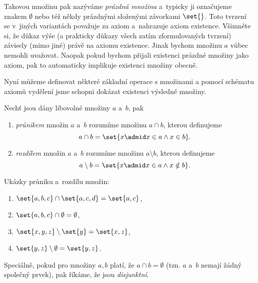 Takovou množinu pak nazýváme \emph{prázdná množina} a~typicky ji označujeme znakem $\emptyset$ nebo též někdy prázdnými složenými závorkami $\set{}$. Toto tvrzení se v~jiných variantách \ZF{} považuje za axiom a~nahrazuje axiom existence. Všimněte si, že důkaz výše (a prakticky důkazy všech zatím zformulovaných tvrzení) závisely (mimo jiné) právě na axiomu existence. Jinak bychom množinu $a$ vůbec nemohli uvažovat. Naopak pokud bychom přijali existenci prázdné množiny jako axiom, pak to automaticky implikuje existenci množiny obecně.\par
Nyní můžeme definovat některé základní operace s množinami a pomocí schématu axiomů vydělení jsme schopni dokázat existenci výsledné množiny.
\begin{definition}\label{def:prunik_rozdil}
    Nechť jsou dány libovolné množiny $a$ a~$b$, pak
    \begin{enumerate}[label=(\roman*)]
        \item \emph{průnikem} množin $a$ a~$b$ rozumíme množinu $a \cap b$, kterou definujeme
        \begin{equation*}
            a\cap b=\set{x \admid x\in a \land x\in b}.
        \end{equation*}
        \item \emph{rozdílem} množin $a$ a~$b$ rozumíme množinu $a \setminus b$, kterou definujeme
        \begin{equation*}
            a\setminus b=\set{x \admid x\in a \land x\notin b}.
        \end{equation*}
    \end{enumerate}
\end{definition}
\begin{example}
    Ukázky průniku a~rozdílu množin:
    \begin{enumerate}[label=(\roman*)]
        \item $\set{a,b,c}\cap\set{a,c,d}=\set{a,c}$,
        \item $\set{a,b,c}\cap\emptyset=\emptyset$,
        \item $\set{x,y,z}\setminus\set{y}=\set{x,z}$,
        \item $\set{y,z}\setminus\emptyset=\set{y,z}$.
    \end{enumerate}
\end{example}
\begin{remark}
    Speciálně, pokud pro množiny $a,b$ platí, že $a\cap b=\emptyset$ (tzn. $a$ a~$b$ nemají žádný společný prvek), pak říkáme, že jsou \emph{disjunktní}.
\end{remark}
